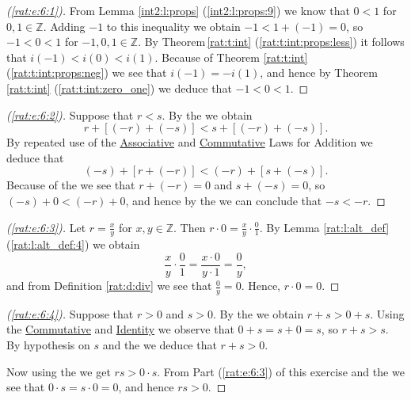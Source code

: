 \begin{proof}[(\ref{rat:e:6:1})]
	From Lemma \ref{int2:l:props} (\ref{int2:l:props:9}) we know that $0 < 1$ for $0,1 \in \mathbb{Z}$. Adding $-1$ to this inequality we obtain $-1 < 1 + (-1) = 0$, so $-1 < 0 < 1$ for $-1,0,1 \in \mathbb{Z}$. By Theorem\,\ref{rat:t:int} (\ref{rat:t:int:props:less}) it follows that $i(-1) < i(0) < i(1)$. Because of Theorem \ref{rat:t:int} (\ref{rat:t:int:props:neg}) we see that $i(-1) = -i(1)$, and hence by Theorem \ref{rat:t:int} (\ref{rat:t:int:zero_one}) we deduce that $-1 < 0 < 1$.
\end{proof}

\begin{proof}[(\ref{rat:e:6:2})]
	Suppose that $r < s$. By the  we obtain
	\[
		r + [(-r) + (-s)] < s + [(-r) + (-s)].
	\]
	By repeated use of the \hyperref[rat:t:props:associative_add]{Associative} and \hyperref[rat:t:props:commutative_add]{Commutative} Laws for Addition we deduce that
	\[
		(-s) + [r + (-r)] < (-r) + [s + (-s)].
	\]
	Because of the  we see that $r + (-r) = 0$ and $s + (-s) = 0$, so $(-s) + 0 < (-r) + 0$, and hence by the  we can conclude that $-s < -r$.
\end{proof}

\begin{proof}[(\ref{rat:e:6:3})]
	Let $r = \frac{x}{y}$ for $x,y \in \mathbb{Z}$. Then $r \cdot 0 = \frac{x}{y} \cdot \frac{0}{1}$. By Lemma \ref{rat:l:alt_def} (\ref{rat:l:alt_def:4}) we obtain
	\[
		\frac{x}{y} \cdot \frac{0}{1} = \frac{x \cdot 0}{y \cdot 1} = \frac{0}{y},
	\]
	and from Definition \ref{rat:d:div} we see that $\frac{0}{y} = 0$. Hence, $r \cdot 0 = 0$.

\end{proof}

\begin{proof}[(\ref{rat:e:6:4})]
	Suppose that $r > 0$ and $s > 0$. By the  we obtain $r + s > 0 + s$. Using the \hyperref[rat:t:props:commutative_add]{Commutative} and \hyperref[rat:t:props:identity_add]{Identity} we observe that $0 + s = s + 0 = s$, so $r + s > s$. By hypothesis on $s$ and the  we deduce that $r + s > 0$.

	Now using the  we get $rs > 0 \cdot s$. From Part (\ref{rat:e:6:3}) of this exercise and the  we see that $0 \cdot s = s \cdot 0 = 0$, and hence $rs > 0$.
\end{proof}

